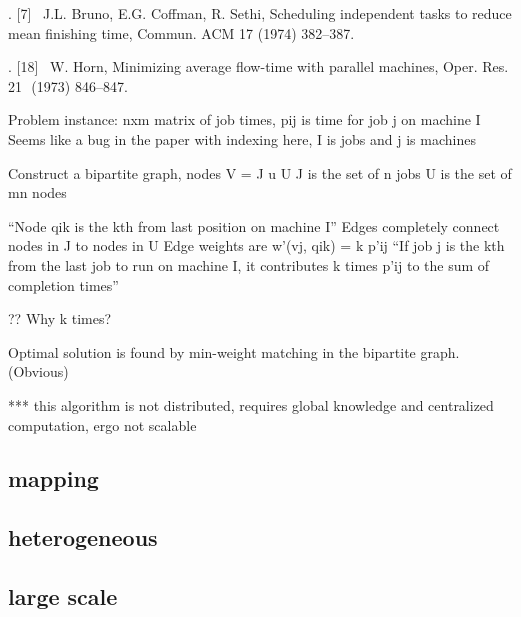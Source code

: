 \documentclass{article}
\begin{document}
	.	[7]  J.L. Bruno, E.G. Coffman, R. Sethi, Scheduling independent tasks to reduce mean finishing time, Commun. ACM 17 (1974) 382–387.

	.	[18]  W. Horn, Minimizing average flow-time with parallel machines, Oper. Res. 21  (1973) 846–847. 

Problem instance: nxm matrix of job times, pij is time for job j on machine I
Seems like a bug in the paper with indexing here, I is jobs and j is machines

Construct a bipartite graph, nodes V = J u U
J is the set of n jobs
U is the set of mn nodes

“Node qik is the kth from last position on machine I”
Edges completely connect nodes in J to nodes in U
Edge weights are w’(vj, qik) = k p’ij
“If job j is the kth from the last job to run on machine I, it contributes k times p’ij to the sum of completion times”

?? Why k times?

Optimal solution is found by min-weight matching in the bipartite graph.  (Obvious)

*** this algorithm is not distributed, requires global knowledge and centralized computation, ergo not scalable












\subsection{mapping}

\cite{doi:10.1137/0611030}
\cite{4227986}
\cite{doi:10.1142/S0129054197000215}
\cite{Sbirlea:2014:BMS:2628071.2628090}

\subsection{heterogeneous}

\cite{Flegar:2017:OLI:3149704.3149767}
\cite{8082085}
\cite{7993387}
\cite{Cederman:2008:DLB:1413957.1413967}
\cite{10.1007/978-981-10-6442-5_56}
\cite{dlbgraphgpu}




\subsection{large scale}

\cite{PEARCE2017}
\cite{BERLINSKA201814}
\cite{8017633}
\cite{DEVINE2005133}
\cite{javataskpool}
\cite{barat:tel-01672546}
\end{document}
